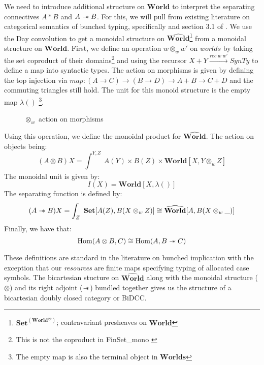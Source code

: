 \documentclass{article}
\newcommand{\sep}{\mathrel{-\mkern-6mu*}}
\newcommand{\pworld}{\widehat{\mathbf{World}}}
\newcommand{\world}{{\mathbf{World}}}
\begin{document}
  We need to introduce additional structure on $\world$ to interpret the 
  separating connectives $A * B$ and $A\sep B$. For this, we will pull 
  from existing literature on categorical semantics of bunched typing, 
  specifically \cite{ohearnResourceInterpretationsBunched1999} and section 3.1 of \cite{pym_semantics_2002}. 
  We use the Day convolution \cite{nlabDayConv} to get a monoidal structure on 
  $\pworld$\footnote{$\mathbf{Set}^{(\world^{op})}$; contravariant presheaves on $\world$} 
  from a monoidal structure on $\world$. First, we define an operation $w \otimes_w w'$ on $worlds$ by taking 
  the set coproduct of their domains\footnote{This is not the coproduct in FinSet\_mono \cite{SE-FinSetMonoCoprod}} 
  and using the recursor $X + Y \xrightarrow{rec \; w \; w'} SynTy$ 
  to define a map into syntactic types. The action on morphisms 
  is given by defining the top injection via $map : (A \rightarrow C) \rightarrow 
  (B \rightarrow D) \rightarrow A + B \rightarrow C + D$ and the commuting triangles still hold. 
  The unit for this monoid structure is the empty map $\lambda()$ 
  \footnote{The empty map is also the terminal object in $\mathbf{Worlds}$}.

\begin{figure}[!ht]
    \centering
    \caption{$\otimes_w$ action on morphisms}
\end{figure}


Using this operation, we define the monoidal product for $\pworld$. The action on objects being: 
\[
(A \otimes B) X = \int_{}^{Y,Z}\ A(Y) \times B(Z) \times \world[X,Y \otimes_w Z]
\]
The monoidal unit is given by: 
\[ 
    I(X) = \mathbf{World}[X , \lambda()]
\]
The separating function is defined by: 
\[
(A \sep B) X = \int_{Z}^{}\ \mathbf{Set}[A(Z), B(X \otimes_w Z)] \cong \pworld[A, B(X\otimes_w\_)]
\]
Finally, we have that:
\[
\textrm{Hom}(A \otimes B , C) \cong \textrm{Hom}(A , B \sep C) 
\]

These definitions are standard in the literature on bunched implication with the 
exception that our \textit{resources} are finite maps specifying typing of allocated
case symbols. The bicartesian stucture on $\pworld$ along with 
the monoidal structure ($\otimes$) and its right adjoint ($\sep$) bundled together 
gives us the structure of a bicartesian doubly closed category or BiDCC.
\end{document}
